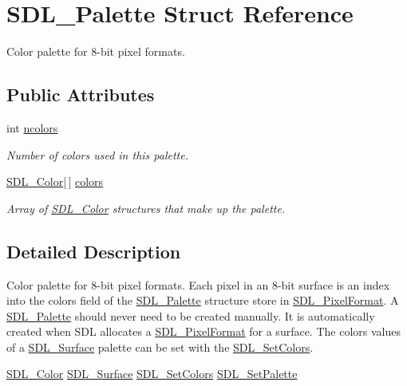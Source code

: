 \hypertarget{struct_s_d_l___palette}{
\section{SDL\_\-Palette Struct Reference}
\label{struct_s_d_l___palette}
}


Color palette for 8-\/bit pixel formats.  


\subsection*{Public Attributes}
\begin{DoxyCompactItemize}
\item 
int \hyperlink{struct_s_d_l___palette_ac5e1433dc0331e63010048d63d2be8e2}{ncolors}
\begin{DoxyCompactList}\small\item\em Number of colors used in this palette. \item\end{DoxyCompactList}\item 
\hyperlink{struct_s_d_l___color}{SDL\_\-Color}\mbox{[}$\,$\mbox{]} \hyperlink{struct_s_d_l___palette_a3c2b56423f3b4721342f1d3c578c74f8}{colors}
\begin{DoxyCompactList}\small\item\em Array of \hyperlink{struct_s_d_l___color}{SDL\_\-Color} structures that make up the palette. \item\end{DoxyCompactList}\end{DoxyCompactItemize}


\subsection{Detailed Description}
Color palette for 8-\/bit pixel formats. Each pixel in an 8-\/bit surface is an index into the colors field of the \hyperlink{struct_s_d_l___palette}{SDL\_\-Palette} structure store in \hyperlink{struct_s_d_l___pixel_format}{SDL\_\-PixelFormat}. A \hyperlink{struct_s_d_l___palette}{SDL\_\-Palette} should never need to be created manually. It is automatically created when SDL allocates a \hyperlink{struct_s_d_l___pixel_format}{SDL\_\-PixelFormat} for a surface. The colors values of a \hyperlink{struct_s_d_l___surface}{SDL\_\-Surface} palette can be set with the \hyperlink{_sdl_8cs_a7d863c2bb7590dba1b9eb040d44449e7}{SDL\_\-SetColors}.

\hyperlink{struct_s_d_l___color}{SDL\_\-Color} \hyperlink{struct_s_d_l___surface}{SDL\_\-Surface} \hyperlink{_sdl_8cs_a7d863c2bb7590dba1b9eb040d44449e7}{SDL\_\-SetColors} \hyperlink{_sdl_8cs_afe8acab3b160f7859c903cec5fbb4f86}{SDL\_\-SetPalette} 

